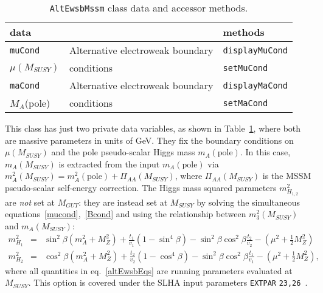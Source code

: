 \documentclass[]{article}
\def\code#1{\small{\tt #1}\normalsize}
\begin{document}
\begin{table}\begin{center}\begin{tabular}{lll}      
data & & methods \\ \hline
\code{muCond} & Alternative electroweak boundary & \code{displayMuCond} \\
 $\mu(M_{SUSY})$ & conditions & \code{setMuCond} \\
\code{maCond} & Alternative electroweak boundary & \code{displayMaCond} \\
 $M_A$(pole) & conditions & \code{setMaCond} \\
\end{tabular}\caption{\label{tab:altewsb}\code{AltEwsbMssm} class data and
  accessor methods.}\end{center}\end{table} 
This class has just two private data variables, as shown in
Table~\ref{tab:altewsb}, 
where both are massive parameters in units of GeV. 
They fix the
boundary conditions on $\mu(M_{SUSY})$ and the pole pseudo-scalar Higgs
mass $m_A(\mbox{pole})$. In this case, $m_A(M_{SUSY})$ is extracted 
from the input $m_A(\mbox{pole})$ via $m_A^2(M_{SUSY}) = m_A^2(\mbox{pole})
 + \Pi_{AA}(M_{SUSY})$, where $\Pi_{AA}(M_{SUSY})$ is the MSSM pseudo-scalar 
self-energy correction.
The Higgs mass squared parameters
$m_{H_{1,2}}^2$ are {\em not}\/ set at $M_{GUT}$: they are instead set at
$M_{SUSY}$ by solving the simultaneous equations~\ref{mucond},~\ref{Bcond}
and using the relationship between $m_3^2(M_{SUSY})$ and $m_A(M_{SUSY})$:
\begin{eqnarray}
m_{H_1}^2 &=& \sin^2 \beta (m_A^2 + M_Z^2) + \frac{t_1}{v_1} (1 - \sin^4
\beta)
- \sin^2 \beta \cos^2 \beta \frac{t_2}{v_2} - (\mu^2 + \frac{1}{2} M_Z^2) 
\nonumber \\
m_{H_2}^2 &=& \cos^2 \beta (m_A^2 + M_Z^2) + \frac{t_2}{v_2} (1 - \cos^4
\beta)
- \sin^2 \beta \cos^2 \beta \frac{t_1}{v_1} - (\mu^2 + \frac{1}{2} M_Z^2),
\label{altEwsbEqs}
\end{eqnarray}
where all quantities in eq.~\ref{altEwsbEqs} are running parameters evaluated
at $M_{SUSY}$. 
This option is covered under the SLHA input parameters
\code{EXTPAR} 
\code{23,26}~\cite{lhacc}. 
\end{document}
